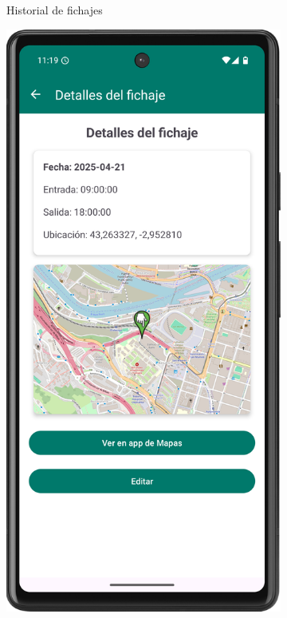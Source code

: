 \begin{figure}[H]
\begin{subfigure}[b]{0.22\textwidth}
         \caption{Historial de fichajes}
         \label{fig:historial}
     \end{subfigure}
     \hfill
     \begin{subfigure}[b]{0.22\textwidth}
         \centering
         \includegraphics[width=\textwidth]{root/detalles.png}

\end{subfigure}
\end{figure}
